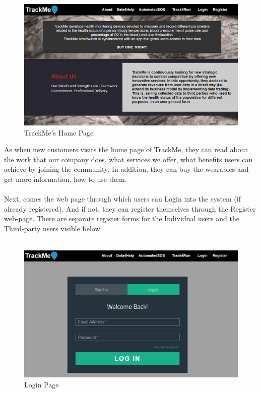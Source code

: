 \documentclass[12pt]{report}
\begin{document}
\begin{figure}[H]
\centering
\includegraphics[scale=0.4]{../Assets/Home_Page.png}
\caption[UI: TrackMe's Home Page]{TrackMe's Home Page}
\label{fig:Home_Page}
\end{figure}

As when new customers visits the home page of TrackMe, they can read about the work that our company does, what services we offer, what benefits users can achieve by joining the community. In addition, they can buy the wearables and get more information, how to use them.\\\\
Next, comes the web page through which users can Login into the system (if already registered). And if not, they can register themselves through the Register web-page. There are separate register forms for the Individual users and the Third-party users visible below:\\\\

\begin{figure}[H]
\centering
\includegraphics[scale=0.35]{../Assets/Login.png}
\caption[UI: Login Page]{Login Page}
\label{fig:Login}
\end{figure}
\end{document}
